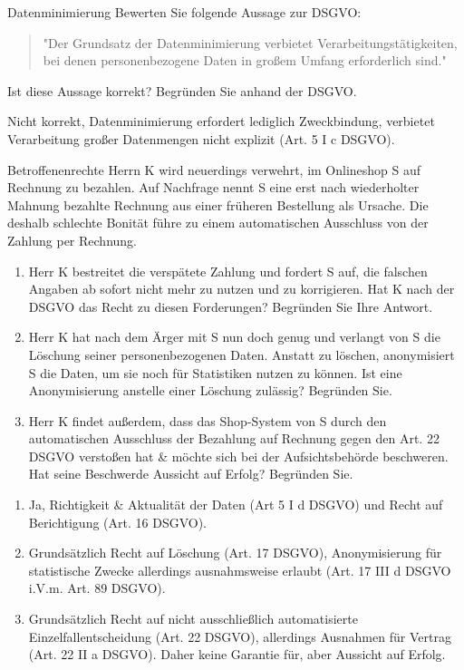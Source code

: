 \documentclass{article}
\begin{document}
\begin{exercise}{Datenminimierung}\label{ex:datenminimierung}
  Bewerten Sie folgende Aussage zur DSGVO:
  \begin{quote}"Der Grundsatz der Datenminimierung verbietet Verarbeitungstätigkeiten, bei denen personenbezogene Daten in großem Umfang erforderlich sind."\end{quote}
  Ist diese Aussage korrekt? Begründen Sie anhand der DSGVO.

  \begin{solution}
    Nicht korrekt, Datenminimierung erfordert lediglich Zweckbindung, verbietet Verarbeitung großer Datenmengen nicht explizit (Art. 5 I c DSGVO).
  \end{solution}
\end{exercise}

\begin{exercise}{Betroffenenrechte}
  Herrn K wird neuerdings verwehrt, im Onlineshop S auf Rechnung zu bezahlen. Auf Nachfrage nennt S eine erst nach wiederholter Mahnung bezahlte Rechnung aus einer früheren Bestellung als Ursache. Die deshalb schlechte Bonität führe zu einem automatischen Ausschluss von der Zahlung per Rechnung.
  \begin{enumerate}
    \item Herr K bestreitet die verspätete Zahlung und fordert S auf, die falschen Angaben ab sofort nicht mehr zu nutzen und zu korrigieren. Hat K nach der DSGVO das Recht zu diesen Forderungen? Begründen Sie Ihre Antwort.
    \item Herr K hat nach dem Ärger mit S nun doch genug und verlangt von S die Löschung seiner personenbezogenen Daten. Anstatt zu löschen, anonymisiert S die Daten, um sie noch für Statistiken nutzen zu können. Ist eine Anonymisierung anstelle einer Löschung zulässig? Begründen Sie.
    \item Herr K findet außerdem, dass das Shop-System von S durch den automatischen Ausschluss der Bezahlung auf Rechnung gegen den Art. 22 DSGVO verstoßen hat \& möchte sich bei der Aufsichtsbehörde beschweren. Hat seine Beschwerde Aussicht auf Erfolg? Begründen Sie.
  \end{enumerate}

  \begin{solution}
    \begin{enumerate}
      \item Ja, Richtigkeit \& Aktualität der Daten (Art 5 I d DSGVO) und Recht auf Berichtigung (Art. 16 DSGVO).
      \item Grundsätzlich Recht auf Löschung (Art. 17 DSGVO), Anonymisierung für statistische Zwecke allerdings ausnahmsweise erlaubt (Art. 17 III d DSGVO i.V.m. Art. 89 DSGVO).
      \item Grundsätzlich Recht auf nicht ausschließlich automatisierte Einzelfallentscheidung (Art. 22 DSGVO), allerdings Ausnahmen für Vertrag (Art. 22 II a DSGVO). Daher keine Garantie für, aber Aussicht auf Erfolg.
    \end{enumerate}
  \end{solution}
\end{exercise}
\end{document}
